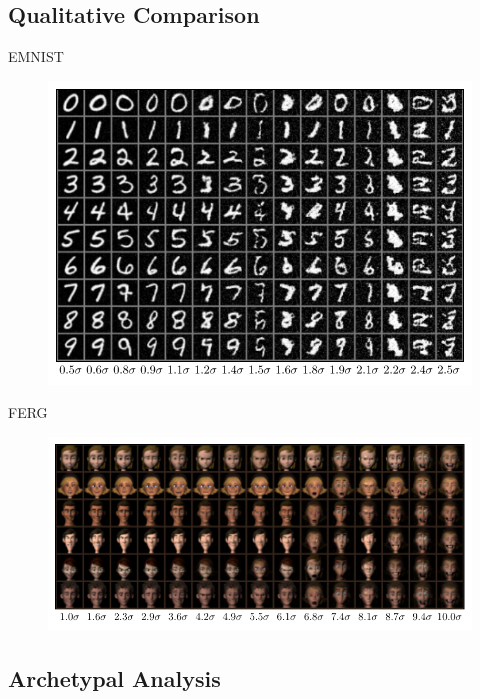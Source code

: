\documentclass[aspectratio=169]{beamer}
\begin{document}
\subsection{Qualitative Comparison}

\begin{frame}{EMNIST}
    \begin{figure}
        \includegraphics[height=0.7\textheight]{beamer-figures/samples/samples_increasing_distance_EMNIST.pdf}
    \end{figure}
\end{frame}
\begin{frame}{FERG}
    \begin{figure}
        \includegraphics[height=0.7\textheight]{beamer-figures/samples/samples_increasing_distance_FERG_people.pdf}
    \end{figure}
\end{frame}

\subsection{Archetypal Analysis}
\end{document}
